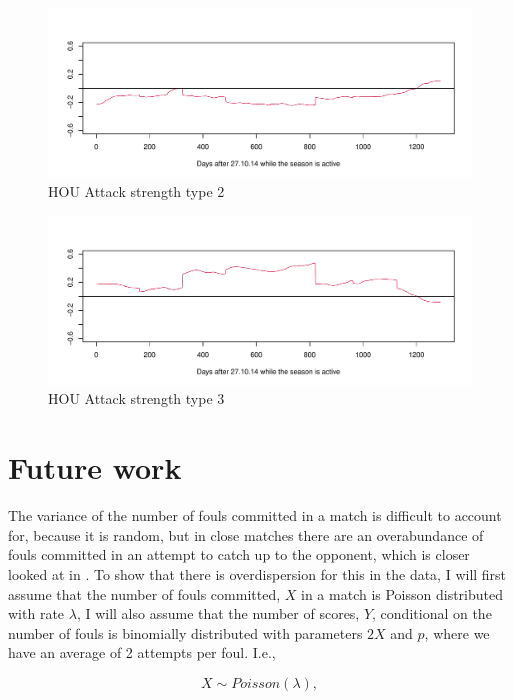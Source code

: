 \begin{figure}[H]
    \centering
    \includegraphics[width=.8\textwidth]{Figures/HOUOU2.pdf}
    \caption[HOU2OU]{HOU Attack strength type 2}
    \label{fig:HOU_2_OU}
\end{figure}

\begin{figure}[H]
    \centering
    \includegraphics[width=.8\textwidth]{Figures/HOUOU3.pdf}
    \caption[HOU3OU]{HOU Attack strength type 3}
    \label{fig:HOU_3_OU}
\end{figure}

\newpage

\section{Future work}  \label{future}

\noindent The variance of the number of fouls committed in a match is difficult to account for, because it is random, but in close matches there are an overabundance of fouls committed in an attempt to catch up to the opponent, which is closer looked at in \cite{poissonNBA}. To show that there is overdispersion for this in the data, I will first assume that the number of fouls committed, $X$ in a match is Poisson distributed with rate $\lambda$, I will also assume that the number of scores, $Y$, conditional on the number of fouls is binomially distributed with parameters $2X$ and $p$, where we have an average of 2 attempts per foul. I.e.,

\begin{equation}
    X \sim Poisson(\lambda),
\end{equation}

